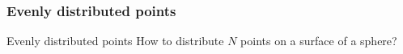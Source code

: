 \documentclass{beamer}
\begin{document}
\subsubsection{Evenly distributed points}
\begin{frame}{Evenly distributed points}
    \centering
    How to distribute $N$ points on a surface of a sphere?\\ ~\\ ~\\
    \begin{columns}
        
    \end{columns}
    \begin{columns}
        \begin{column}{0.4\textwidth}
            \begin{itemize}
            \end{itemize}
        \end{column}
        \begin{column}{0.2\textwidth}
        \end{column}
        \begin{column}{0.4\textwidth}
            \begin{itemize}
            \end{itemize}
        \end{column}
    \end{columns}
\end{frame}
\end{document}
